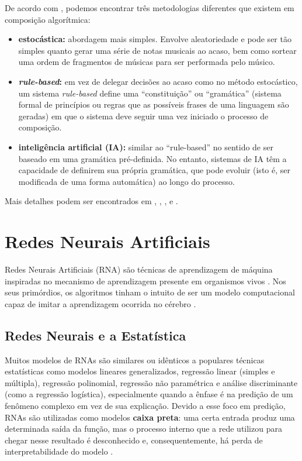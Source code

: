 \documentclass{automatextcc}
\begin{document}
De acordo com \citet{maurer}, podemos encontrar três metodologias diferentes que existem em composição algorítmica: 
\begin{itemize}
    \item \textbf{estocástica:} abordagem mais simples. Envolve aleatoriedade e pode ser tão simples quanto gerar uma série de notas musicais ao acaso, bem como sortear uma ordem de fragmentos de músicas para ser performada pelo músico.
    \item \textbf{\textit{rule-based}:} em vez de delegar decisões ao acaso como no método estocástico, um sistema \textit{rule-based} define uma ``constituição'' ou ``gramática'' (sistema formal de princípios ou regras que as possíveis frases de uma linguagem são geradas) em que o sistema deve seguir uma vez iniciado o processo de composição. 
    \item \textbf{inteligência artificial (IA): }similar ao ``rule-based'' no sentido de ser baseado em uma gramática pré-definida. No entanto, sistemas de IA têm a capacidade de definirem sua própria gramática, que pode evoluir (isto é, ser modificada de uma forma automática) ao longo do processo.
\end{itemize}
Mais detalhes podem ser encontrados em \citet{alpern1995}, \citet{maurer}, \citet{nierhaus2009}, \citet{fernandez2013} e \citet{olivan2021}.  



\section{Redes Neurais Artificiais}
Redes Neurais Artificiais (RNA) são técnicas de aprendizagem de máquina inspiradas no mecanismo de aprendizagem presente em organismos vivos \citep{aggarwal2018}. Nos seus primórdios, os algoritmos tinham o intuito de ser um modelo computacional capaz de imitar a aprendizagem ocorrida no cérebro \citep{goodfellow2016}.



\subsection{Redes Neurais e a Estatística}
Muitos modelos de RNAs são similares ou idênticos a populares técnicas estatísticas como modelos lineares generalizados, regressão linear (simples e múltipla), regressão polinomial, regressão não paramétrica e análise discriminante (como a regressão logística), especialmente quando a ênfase é na predição de um fenômeno complexo em vez de sua explicação. Devido a esse foco em predição, RNAs são utilizadas como modelos \textbf{caixa preta}: uma certa entrada produz uma determinada saída da função, mas o processo interno que a rede utilizou para chegar nesse resultado é desconhecido e, consequentemente, há perda de interpretabilidade do modelo \citep{sarle1994, cheng1994, rojas1996}.
\end{document}
